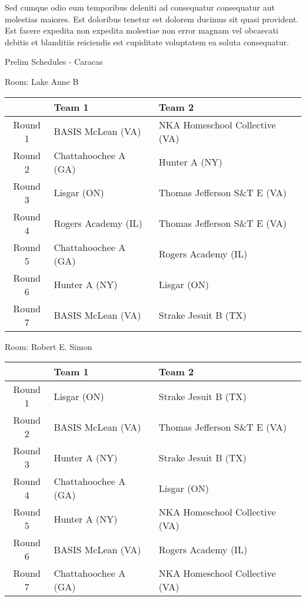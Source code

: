 \documentclass{article}%
\begin{document}
\newline%
Sed cumque odio eum temporibus deleniti ad consequatur consequatur aut molestias maiores. Est doloribus tenetur est dolorem ducimus sit quasi provident. Est facere expedita non expedita molestiae non error magnam vel obcaecati debitis et blanditiis reiciendis est cupiditate voluptatem ea soluta consequatur.%
\newpage%
\begin{center}%
\begin{Huge}%
Prelim Schedules {-} Caracas%
\end{Huge}%
\end{center}%
\begin{flushleft}%
\begin{Large}%
Room: Lake Anne B%
\end{Large}%
\end{flushleft}%
\begin{tabularx}{\textwidth}{|c|Y|Y|}%
\hline%
&Team 1&Team 2\\%
\hline%
Round 1&BASIS McLean (VA)&NKA Homeschool Collective (VA)\\%
Round 2&Chattahoochee A (GA)&Hunter A (NY)\\%
Round 3&Lisgar (ON)&Thomas Jefferson S\&T E (VA)\\%
Round 4&Rogers Academy (IL)&Thomas Jefferson S\&T E (VA)\\%
Round 5&Chattahoochee A (GA)&Rogers Academy (IL)\\%
Round 6&Hunter A (NY)&Lisgar (ON)\\%
Round 7&BASIS McLean (VA)&Strake Jesuit B (TX)\\%
\hline%
\end{tabularx}%
\vspace*{8pt}%
\linebreak%
\begin{flushleft}%
\begin{Large}%
Room: Robert E. Simon%
\end{Large}%
\end{flushleft}%
\begin{tabularx}{\textwidth}{|c|Y|Y|}%
\hline%
&Team 1&Team 2\\%
\hline%
Round 1&Lisgar (ON)&Strake Jesuit B (TX)\\%
Round 2&BASIS McLean (VA)&Thomas Jefferson S\&T E (VA)\\%
Round 3&Hunter A (NY)&Strake Jesuit B (TX)\\%
Round 4&Chattahoochee A (GA)&Lisgar (ON)\\%
Round 5&Hunter A (NY)&NKA Homeschool Collective (VA)\\%
Round 6&BASIS McLean (VA)&Rogers Academy (IL)\\%
Round 7&Chattahoochee A (GA)&NKA Homeschool Collective (VA)\\%
\hline%
\end{tabularx}%
\end{document}
